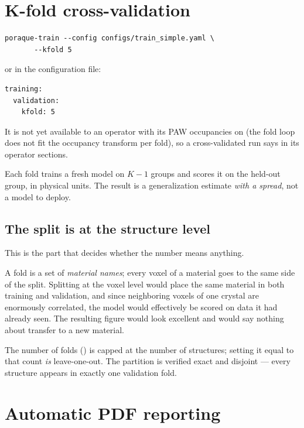 \section{K-fold cross-validation}
\label{sec:kfold}

\begin{lstlisting}
poraque-train --config configs/train_simple.yaml \
       --kfold 5
\end{lstlisting}

or in the configuration file:

\begin{lstlisting}
training:
  validation:
    kfold: 5
\end{lstlisting}

It is not yet available to an operator with its PAW occupancies on (the fold
loop does not fit the occupancy transform per fold), so a cross-validated run
says \opt{occupancies: false} in its operator sections.

Each fold trains a fresh model on $K-1$ groups and scores it on the held-out
group, in physical units. The result is a generalization estimate \emph{with a
spread}, not a model to deploy.

\subsection{The split is at the structure level}

This is the part that decides whether the number means anything.

A fold is a set of \emph{material names}; every voxel of a material goes to the
same side of the split. Splitting at the voxel level would place the same
material in both training and validation, and since neighboring voxels of one
crystal are enormously correlated, the model would effectively be scored on
data it had already seen. The resulting figure would look excellent and would
say nothing about transfer to a new material.

\begin{ptip}
The number of folds () is capped at the number of structures; setting it equal to that
count \emph{is} leave-one-out. The partition is verified exact and disjoint ---
every structure appears in exactly one validation fold.
\end{ptip}

\section{Automatic PDF reporting}
\label{sec:pdfreports}

